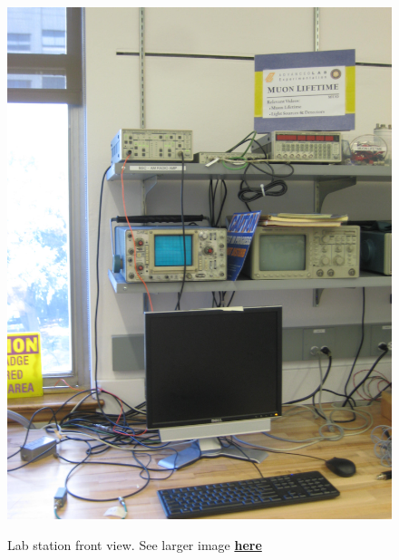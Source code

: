 \documentclass{../lab}
\begin{document}
\begin{figure}[h]
\begin{minipage}{0.24\textwidth}
    \href{http://experimentationlab.berkeley.edu/sites/default/files/images/MUO_3517.jpg}{\includegraphics[width=\linewidth,keepaspectratio]{images/MUO_3517.jpg}}
    \caption{Lab station front view. See larger image \href{http://experimentationlab.berkeley.edu/sites/default/files/images/MUO_3517.jpg}{\textbf{here}}}
\end{minipage}
\begin{minipage}{0.18\textwidth}

\end{minipage}
\end{figure}
\end{document}
